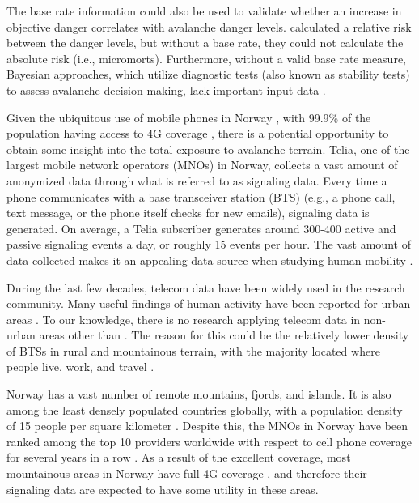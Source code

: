 \documentclass[authordate,empirical]{jote-new-article}
\begin{document}
The base rate information could also be used to validate whether an increase in objective danger correlates with avalanche danger levels. \textcite{Winkler2021} calculated a relative risk between the danger levels, but without a base rate, they could not calculate the absolute risk (i.e., micromorts). Furthermore, without a valid base rate measure, Bayesian approaches, which utilize diagnostic tests (also known as stability tests) to assess avalanche decision-making, lack important input data \parencites{Ebert2019}{Techel2020}.







Given the ubiquitous use of mobile phones in Norway \parencites{Statista2021}, with 99.9\% of the population having access to 4G coverage \parencites{MLGM2021}, there is a potential opportunity to obtain some insight into the total exposure to avalanche terrain. Telia, one of the largest mobile network operators (MNOs) in Norway, collects a vast amount of anonymized data through what is referred to as signaling data. Every time a phone communicates with a base transceiver station (BTS) (e.g., a phone call, text message, or the phone itself checks for new emails), signaling data is generated. On average, a Telia subscriber generates around 300-400 active and passive signaling events a day, or roughly 15 events per hour. The vast amount of data collected makes it an appealing data source when studying human mobility \parencites{Zhao2016}.







During the last few decades, telecom data have been widely used in the research community. Many useful findings of human activity have been reported for urban areas \parencites{González2008}{Song2010}. To our knowledge, there is no research applying telecom data in non-urban areas other than \textcite{Francisco2018}. The reason for this could be the relatively lower density of BTSs in rural and mountainous terrain, with the majority located where people live, work, and travel \parencites{Zhao2016}.







Norway has a vast number of remote mountains, fjords, and islands. It is also among the least densely populated countries globally, with a population density of 15 people per square kilometer \parencites{UN2021}. Despite this, the MNOs in Norway have been ranked among the top 10 providers worldwide with respect to cell phone coverage for several years in a row \parencites{Speedtest2021}. As a result of the excellent coverage, most mountainous areas in Norway have full 4G coverage \parencites{Telenor2021}{Telia2021}, and therefore their signaling data are expected to have some utility in these areas.
\end{document}
